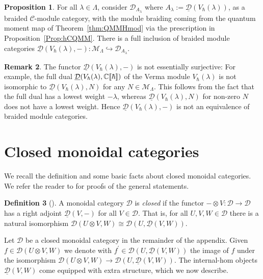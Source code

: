 \documentclass[12pt,dvipsnames]{article}
\numberwithin{equation}{section}
\theoremstyle{definition}
\newtheorem{definition}{Definition}[section]
\newtheorem{remark}[definition]{Remark}
\newtheorem{proposition}[definition]{Proposition}
\newcommand{\cat}[1]{\mathcal{#1}}
\newcommand{\C}{\ensuremath{\mathbb{C}}}
\newcommand{\1}{\ensuremath{\mathbbm{1}}}
\newcommand{\blank}{{-}}
\newcommand{\llb}{[\hspace{-1.7pt}[}
\newcommand{\rrb}{]\hspace{-1.7pt}]}
\begin{document}
\begin{proposition}\label{prop:VermaQMM}
    For all $\lambda\in\Lambda$, consider $\cat{D}_{A_\lambda}$ where $A_\lambda := \underline{\cat{D}}(V_\hbar(\lambda))$, as a braided $\cat{C}$-module category, with the module braiding coming from the quantum moment map of Theorem~\ref{thm:QMMHmod} via the prescription in Proposition~\ref{Prop:hCQMM}. There is a full inclusion of braided module categories $\underline{\cat{D}}(V_\hbar(\lambda),\blank):\cat{M}_\Lambda\hookrightarrow\cat{D}_{A_\lambda}$.
\end{proposition}
\begin{remark}\label{rem:Not an equivalence}
    The functor $\underline{\cat{D}}(V_\hbar(\lambda),\blank)$ is not essentially surjective: For example, the full dual $\underline{\cat{D}}(V_\hbar(\lambda),\C\llb\hbar\rrb)$ of the Verma module $V_\hbar(\lambda)$ is not isomorphic to $\underline{\cat{D}}(V_\hbar(\lambda),N)$ for any $N\in\cat{M}_\Lambda$. This follows from the fact that the full dual has a lowest weight $-\lambda$, whereas $\underline{\cat{D}}(V_\hbar(\lambda),N)$ for non-zero $N$ does not have a lowest weight. Hence $\underline{\cat{D}}(V_\hbar(\lambda),\blank)$ is not an equivalence of braided module categories.
\end{remark}

\appendix

\section{Closed monoidal categories}\label{app:closed}

We recall the definition and some basic facts about closed monoidal categories. We refer the reader to \cite{EK66} for proofs of the general statements.
\begin{definition}[{\cite[Sec.\,II.2 \& Thm.\,II.5.3]{EK66}}]
    A monoidal category $\cat{D}$ is \emph{closed} if the functor $\blank\otimes V:\cat{D}\to\cat{D}$ has a right adjoint $\underline{\cat{D}}(V,\blank)$ for all $V\in\cat{D}$. That is, for all $U,V,W\in\cat{D}$ there is a natural isomorphism $\cat{D}(U\otimes V,W) \cong \cat{D}(U,\underline{\cat{D}}(V,W))$.
\end{definition}
Let $\cat{D}$ be a closed monoidal category in the remainder of the appendix. Given $f\in\cat{D}(U\otimes V,W)$ we denote with $f^\prime\in\cat{D}(U,\underline{\cat{D}}(V,W))$ the image of $f$ under the isomorphism $\cat{D}(U\otimes V,W) \to \cat{D}(U,\underline{\cat{D}}(V,W))$. The internal-hom objects $\underline{\cat{D}}(V,W)$ come equipped with extra structure, which we now describe. 
\end{document}
